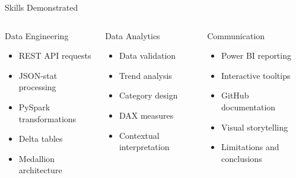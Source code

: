 \documentclass[aspectratio=169]{beamer}
\begin{document}
\begin{frame}{Skills Demonstrated}

\begin{columns}[T]

\begin{block}{Data Engineering}
\begin{itemize}
    \item REST API requests
    \item JSON-stat processing
    \item PySpark transformations
    \item Delta tables
    \item Medallion architecture
\end{itemize}
\end{block}

\begin{block}{Data Analytics}
\begin{itemize}
    \item Data validation
    \item Trend analysis
    \item Category design
    \item DAX measures
    \item Contextual interpretation
\end{itemize}
\end{block}

\begin{block}{Communication}
\begin{itemize}
    \item Power BI reporting
    \item Interactive tooltips
    \item GitHub documentation
    \item Visual storytelling
    \item Limitations and conclusions
\end{itemize}
\end{block}

\end{columns}

\end{frame}
\end{document}
